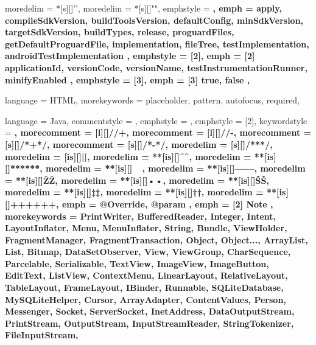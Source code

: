  {
	moredelim = *[s][\color{gray}]{'}{'},
	moredelim = *[s][\color{ForestGreen}]{"}{"},
	emphstyle = \bfseries,
	emph = {
		apply,
		compileSdkVersion,
		buildToolsVersion,
		defaultConfig,
		minSdkVersion,
		targetSdkVersion,
		buildTypes,
		release,
		proguardFiles,
		getDefaultProguardFile,
		implementation,
		fileTree, testImplementation,
		androidTestImplementation
	},
	emphstyle = {[2]\bfseries\color{violet}},
	emph = {[2]
		applicationId,
		versionCode,
		versionName,
		testInstrumentationRunner,
		minifyEnabled
	},
	emphstyle = {[3]\bfseries\color{orange}},
	emph = {[3]
		true,
		false
	},
}

 {
	language = HTML,
	morekeywords = {
		placeholder,
		pattern,
		autofocus,
		required,
	}
}

 {
	language = Java,
	commentstyle = \color{ashgrey},
	emphstyle = {\color{darkgray}},
	emphstyle = {[2]\bfseries},
	keywordstyle = \color{black}\bfseries,
	morecomment = [l][\color{blue}]{//+},		%
	morecomment = [l][\color{red}]{//-},		%
	morecomment = [s][\color{blue}]{/*+}{*/},	%
	morecomment = [s][\color{red}]{/*-}{*/},	%
	moredelim = [s][\color{ashgrey}]{/**}{*/},		%
	moredelim = [is][\soutthick]{|}{|},						%
	moredelim = **[is][\color{blue}]{^}{^},					%
	moredelim = **[is][\color{ForestGreen}]{***}{***},		%
	moredelim = **[is][\color{red}]{~}{~},					%
	moredelim = **[is][\btHL]{---}{---},					%
	moredelim = **[is][{\btHL[fill=blue!60]}]{Ž}{Ž},		%
	moredelim = **[is][{\btHL[fill=SkyBlue]}]{•}{•},		%
	moredelim = **[is][{\btHL[fill=orange!60]}]{Š}{Š},		%
	moredelim = **[is][{\btHL[fill=yellow!60]}]{‡}{‡},		%
	moredelim = **[is][{\btHL[fill=ForestGreen]}]{†}{†},	%
	moredelim = **[is][{\btHL[fill=green!30]}]{+++}{+++},	%
	emph = {
		@Override,
		@param
	},
	emph = {[2]
		Note
	},
	morekeywords = {
		PrintWriter, BufferedReader, Integer,
		Intent, LayoutInflater, Menu, MenuInflater, String, Bundle, ViewHolder,
		FragmentManager, FragmentTransaction,
		Object, Object...,
		ArrayList, List, Bitmap, DataSetObserver,
		View, ViewGroup,
		CharSequence, Parcelable, Serializable,
		TextView, ImageView,
		ImageButton, EditText, ListView, ContextMenu,
		LinearLayout, RelativeLayout, TableLayout, FrameLayout,
		IBinder, Runnable,
		SQLiteDatabase, MySQLiteHelper, Cursor, ArrayAdapter, ContentValues,
		Person, Messenger,
		Socket, ServerSocket,
		InetAddress, DataOutputStream, PrintStream, OutputStream, InputStreamReader, StringTokenizer, FileInputStream,
	}
}

